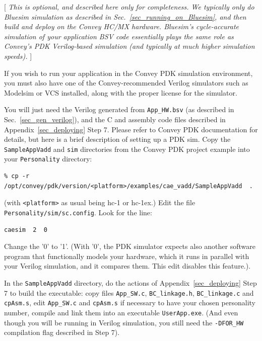 \documentclass[twoside,letterpaper,11pt]{article}
\begin{document}
[ \emph{This is optional, and described here only for completeness.
We typically only do Bluesim simulation as described in
Sec.~\ref{sec_running_on_Bluesim}, and then build and deploy on the
Convey HC/MX hardware.  Bluesim's cycle-accurate simulation of your
application BSV code essentially plays the same role as Convey's PDK
Verilog-based simulation (and typically at much higher simulation
speeds).} ]

If you wish to run your application in the Convey PDK simulation
environment, you must also have one of the Convey-recommended Verilog
simulators such as Modelsim or VCS installed, along with the proper
license for the simulator.

You will just need the Verilog generated from \verb|App_HW.bsv| (as
described in Sec.~\ref{sec_gen_verilog}), and the C and assembly code
files described in Appendix~\ref{sec_deploying} Step 7.  Please refer
to Convey PDK documentation for details, but here is a brief
description of setting up a PDK sim.  Copy the \verb|SampleAppVadd|
and \verb|sim| directories from the Convey PDK project example into
your \verb|Personality| directory:
\begin{Verbatim}[frame=single, label=Convey PDK sim setup]
% cp -r /opt/convey/pdk/version/<platform>/examples/cae_vadd/sim            .
% cp -r /opt/convey/pdk/version/<platform>/examples/cae_vadd/SampleAppVadd  .
\end{Verbatim}

(with \verb|<platform>| as usual being hc-1 or hc-1ex.)
Edit the file \verb|Personality/sim/sc.config|. Look for the line:

\begin{Verbatim}[frame=single, label=Edit this line in the file sc.config]
    caesim  2  0
\end{Verbatim}

Change the '0' to '1'.  (With '0', the PDK simulator expects also
another software program that functionally models your hardware, which
it runs in parallel with your Verilog simulation, and it compares
them.  This edit disables this feature.).

In the \verb|SampleAppVadd| directory, do the actions of
Appendix~\ref{sec_deploying} Step 7 to build the executable: copy
files \verb|App_SW.c|, \verb|BC_linkage.h|, \verb|BC_linkage.c| and
\verb|cpAsm.s|, edit \verb|App_SW.c| and \verb|cpAsm.s| if necessary
to have your chosen personality number, compile and link them into an
executable \verb|UserApp.exe|.  (And even though you will be running
in Verilog simulation, you still need the \verb|-DFOR_HW| compilation
flag described in Step 7).
\end{document}
